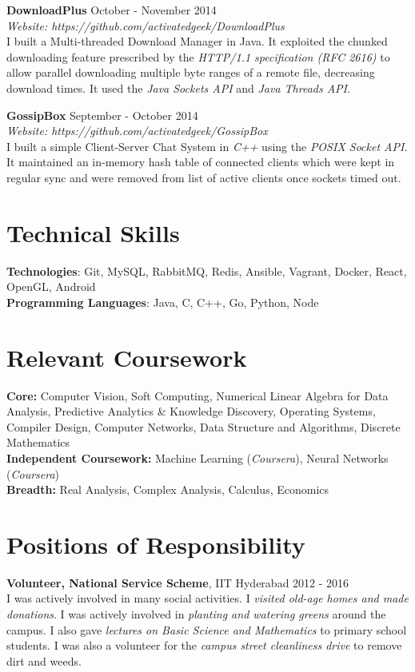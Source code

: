 \documentclass[margin,line]{res}
\begin{document}
\begin{resume}
  \vspace*{-2mm}
  {\bf DownloadPlus} \hfill October - November 2014 \\
  	{\it Website: https://github.com/activatedgeek/DownloadPlus} \\
  	I built a Multi-threaded Download Manager in Java. It exploited the chunked downloading feature prescribed by the {\it HTTP/1.1 specification (RFC 2616)} to allow parallel downloading multiple byte ranges of a remote file, decreasing download times. It used the {\it Java Sockets API} and {\it Java Threads API}.

  \vspace*{-2mm}
  {\bf GossipBox} \hfill September - October 2014 \\
    {\it Website: https://github.com/activatedgeek/GossipBox} \\
    I built a simple Client-Server Chat System in {\it C++} using the {\it POSIX Socket API}. It maintained an in-memory hash table of connected clients which were kept in regular sync and were removed from list of active clients once sockets timed out.

\section{\sc Technical Skills}
  {\bf Technologies}: Git, MySQL, RabbitMQ, Redis, Ansible, Vagrant, Docker, React, OpenGL, Android \\
  {\bf Programming Languages}: Java, C, C++, Go, Python, Node

\section{\sc Relevant Coursework}
  {\bf Core:} Computer Vision, Soft Computing, Numerical Linear Algebra for Data Analysis, Predictive Analytics \& Knowledge Discovery, Operating Systems, Compiler Design, Computer Networks, Data Structure and Algorithms, Discrete Mathematics \\
  {\bf Independent Coursework:} Machine Learning ({\it Coursera}), Neural Networks ({\it Coursera}) \\
  {\bf Breadth:} Real Analysis, Complex Analysis, Calculus, Economics \\

\section{\sc Positions of Responsibility}
  {\bf Volunteer, National Service Scheme}, IIT Hyderabad \hfill 2012 - 2016 \\
    I was actively involved in many social activities. I {\it visited old-age homes and made donations}. I was actively involved in {\it planting and watering greens} around the campus. I also gave {\it lectures on Basic Science and Mathematics} to primary school students. I was also a volunteer for the {\it campus street cleanliness drive} to remove dirt and weeds.


\end{resume}
\end{document}
